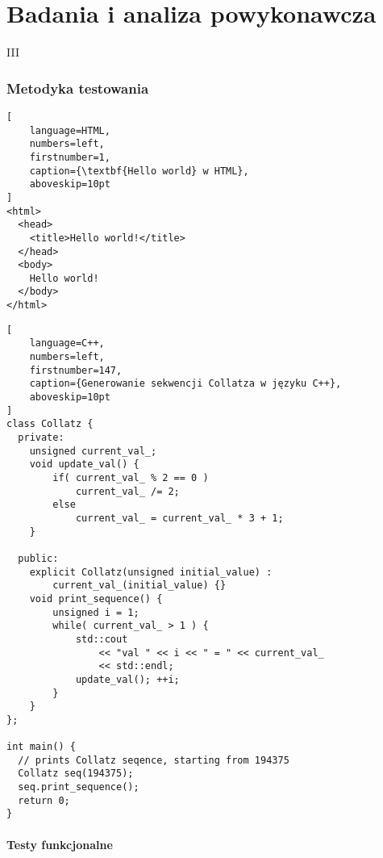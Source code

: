 \part{Badania i analiza powykonawcza}{III}
\noindent \lipsum[1-5]

\clearpage\section{Metodyka testowania}
\noindent \lipsum[10]

\begin{addmargin}[8mm]{0mm}
\begin{lstlisting}[
    language=HTML,
    numbers=left,
    firstnumber=1,
    caption={\textbf{Hello world} w HTML},
    aboveskip=10pt
]
<html>
  <head>
    <title>Hello world!</title>
  </head>
  <body>
    Hello world!
  </body>
</html>
\end{lstlisting}
\end{addmargin}

\lipsum[11]

\begin{addmargin}[12mm]{0mm}
\begin{lstlisting}[
    language=C++,
    numbers=left,
    firstnumber=147,
    caption={Generowanie sekwencji Collatza w języku C++},
    aboveskip=10pt
]
class Collatz {
  private:
    unsigned current_val_;
    void update_val() {
        if( current_val_ % 2 == 0 )
            current_val_ /= 2;
        else
            current_val_ = current_val_ * 3 + 1;
    }

  public:
    explicit Collatz(unsigned initial_value) :
        current_val_(initial_value) {}
    void print_sequence() {
        unsigned i = 1;
        while( current_val_ > 1 ) {
            std::cout
                << "val " << i << " = " << current_val_
                << std::endl;
            update_val(); ++i;
        }
    }
};

int main() {
  // prints Collatz seqence, starting from 194375
  Collatz seq(194375);
  seq.print_sequence();
  return 0;
}
\end{lstlisting}
\end{addmargin}

\lipsum[12]
 
    \subsection{Testy funkcjonalne}
      \noindent\lipsum[1-3]

